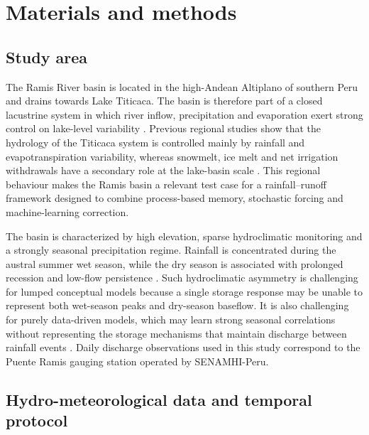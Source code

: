\section{Materials and methods}\label{sec:methods}

\subsection{Study area}\label{subsec:study-area}

The Ramis River basin is located in the high-Andean Altiplano of
southern Peru and drains towards Lake Titicaca. The basin is therefore
part of a closed lacustrine system in which river inflow, precipitation
and evaporation exert strong control on lake-level variability
\citep{cross2001late,condom2004transient,lima2025modeling}. Previous
regional studies show that the hydrology of the Titicaca system is
controlled mainly by rainfall and evapotranspiration variability,
whereas snowmelt, ice melt and net irrigation withdrawals have a
secondary role at the lake-basin scale \citep{lima2025modeling}. This
regional behaviour makes the Ramis basin a relevant test case for a
rainfall--runoff framework designed to combine process-based memory,
stochastic forcing and machine-learning correction.

The basin is characterized by high elevation, sparse hydroclimatic
monitoring and a strongly seasonal precipitation regime. Rainfall is
concentrated during the austral summer wet season, while the dry season
is associated with prolonged recession and low-flow persistence
\citep{condom2004transient,nauditt2017conceptual,lima2025modeling}.
Such hydroclimatic asymmetry is challenging for lumped conceptual
models because a single storage response may be unable to represent both
wet-season peaks and dry-season baseflow. It is also challenging for
purely data-driven models, which may learn strong seasonal correlations
without representing the storage mechanisms that maintain discharge
between rainfall events \citep{van2013influence,lees2021benchmarking}.
Daily discharge observations used in this study correspond to the
Puente Ramis gauging station operated by SENAMHI-Peru.


\subsection{Hydro-meteorological data and temporal protocol}
\label{subsec:data-protocol}


